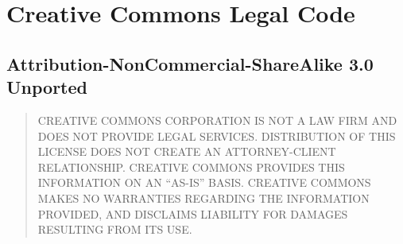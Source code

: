 \section{Creative Commons Legal Code}

\subsection{Attribution-NonCommercial-ShareAlike 3.0 Unported}





\begin{quotation}
CREATIVE COMMONS CORPORATION IS NOT A LAW FIRM AND DOES
NOT PROVIDE LEGAL SERVICES. DISTRIBUTION OF THIS LICENSE
DOES NOT CREATE AN ATTORNEY-CLIENT RELATIONSHIP. CREATIVE
COMMONS PROVIDES THIS INFORMATION ON AN ``AS-IS'' BASIS.
CREATIVE COMMONS MAKES NO WARRANTIES REGARDING THE
INFORMATION PROVIDED, AND DISCLAIMS LIABILITY FOR DAMAGES
RESULTING FROM ITS USE.
\end{quotation}
